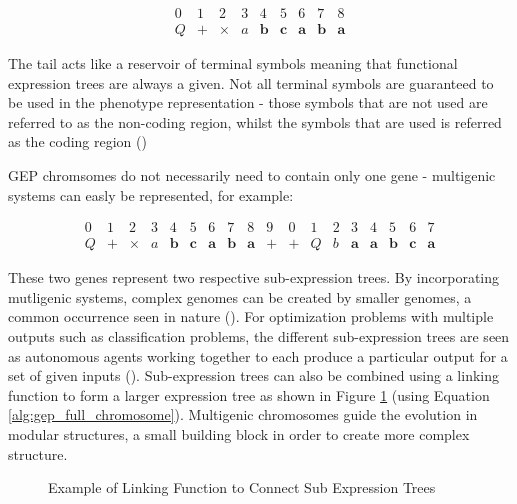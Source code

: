 \begin{equation}\label{alg:gep_full_chromosome}
    \begin{array}{ccccccccc}
        0 & 1 & 2 & 3 & 4 & 5 & 6 & 7 & 8\\
        Q & + & \times & a & \textbf{b} & \textbf{c} & \textbf{a} & \textbf{b} & \textbf{a}
    \end{array}
\end{equation}

\noindent The tail acts like a reservoir of terminal symbols meaning that functional expression trees are always a given. Not all terminal symbols are guaranteed to be used in the phenotype representation - those symbols that are not used are referred to as the non-coding region, whilst the symbols that are used is referred as the coding region (\cite{ferreira2006gene}) \bigskip

\noindent GEP chromsomes do not necessarily need to contain only one gene - multigenic systems can easly be represented, for example:

\begin{equation}\label{alg:gep_full_chromosome}
    \begin{array}{cccccccccccccccccc}
        0 & 1 & 2 & 3 & 4 & 5 & 6 & 7 & 8 & 9 & 0 & 1 & 2 & 3 & 4 & 5 & 6 & 7 \\
        Q & + & \times & a & \textbf{b} & \textbf{c} & \textbf{a} & \textbf{b} & \textbf{a} & + & + & Q & b & \textbf{a} & \textbf{a} & \textbf{b} & \textbf{c} & \textbf{a}
    \end{array}
\end{equation}

\noindent These two genes represent two respective sub-expression trees. By incorporating mutligenic systems, complex genomes can be created by smaller genomes, a common occurrence seen in nature (\cite{ferreira2006gene}). For optimization problems with multiple outputs such as classification problems, the different sub-expression trees are seen as autonomous agents working together to each produce a particular output for a set of given inputs (\cite{ferreira2006gene}). Sub-expression trees can also be combined using a linking function to form a larger expression tree as shown in Figure \ref{fig:gep_linking_function} (using Equation \ref{alg:gep_full_chromosome}). Multigenic chromosomes guide the evolution in modular structures, a small building block in order to create more complex structure.

\begin{figure}[H] %
	\centering %
	\caption{Example of Linking Function to Connect Sub Expression Trees}
	\label{fig:gep_linking_function} %
\end{figure}


